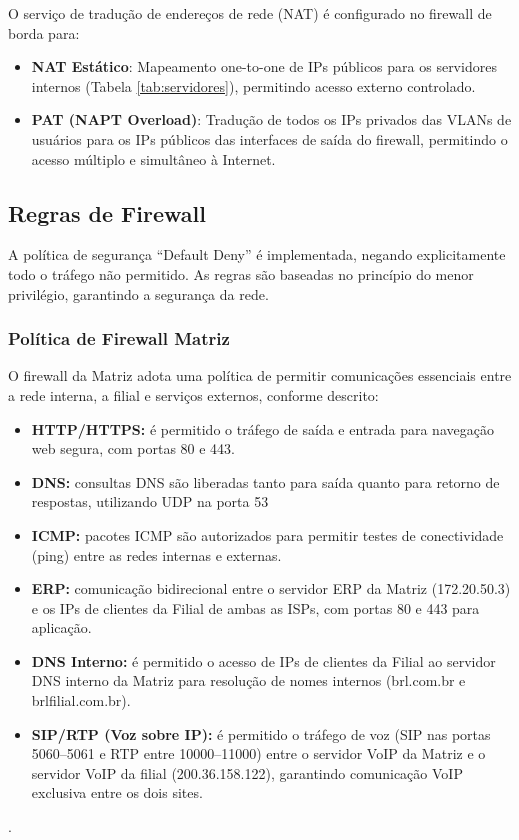 \documentclass[a4paper, 12pt]{article}
\begin{document}
O serviço de tradução de endereços de rede (NAT) é configurado no firewall de borda para:
\begin{itemize}
    \item \textbf{NAT Estático}: Mapeamento one-to-one de IPs públicos para os servidores internos (Tabela \ref{tab:servidores}), permitindo acesso externo controlado.
    \item \textbf{PAT (NAPT Overload)}: Tradução de todos os IPs privados das VLANs de usuários para os IPs públicos das interfaces de saída do firewall, permitindo o acesso múltiplo e simultâneo à Internet.
\end{itemize}

\subsection{Regras de Firewall}
\label{subsec:firewall}

A política de segurança ``Default Deny'' é implementada, negando explicitamente todo o tráfego não permitido. As regras são baseadas no princípio do menor privilégio, garantindo a segurança da rede.

\subsubsection{Política de Firewall Matriz}

O firewall da Matriz adota uma política de permitir comunicações essenciais entre a rede interna, a filial e serviços externos, conforme descrito:

\begin{itemize}
    \item \textbf{HTTP/HTTPS:} é permitido o tráfego de saída e entrada para navegação web segura, com portas 80 e 443.
    \item \textbf{DNS:} consultas DNS são liberadas tanto para saída quanto para retorno de respostas, utilizando UDP na porta 53
    \item \textbf{ICMP:} pacotes ICMP são autorizados para permitir testes de conectividade (ping) entre as redes internas e externas.
    \item \textbf{ERP:} comunicação bidirecional entre o servidor ERP da Matriz (172.20.50.3) e os IPs de clientes da Filial de ambas as ISPs, com portas 80 e 443 para aplicação.
    \item \textbf{DNS Interno:} é permitido o acesso de IPs de clientes da Filial ao servidor DNS interno da Matriz para resolução de nomes internos (brl.com.br e brlfilial.com.br).
    \item \textbf{SIP/RTP (Voz sobre IP):} é permitido o tráfego de voz (SIP nas portas 5060–5061 e RTP entre 10000–11000) entre o servidor VoIP da Matriz e o servidor VoIP da filial (200.36.158.122), garantindo comunicação VoIP exclusiva entre os dois sites.
\end{itemize}.
\end{document}

